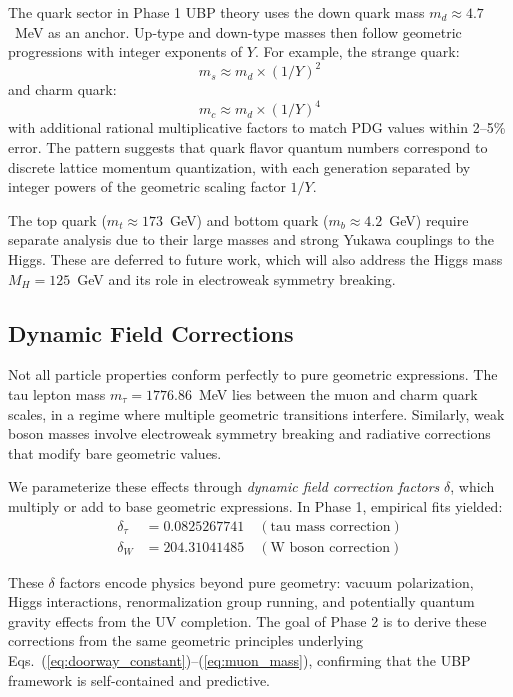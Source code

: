 \documentclass[11pt,a4paper]{article}
\begin{document}
The quark sector in Phase 1 UBP theory uses the down quark mass $m_d \approx 4.7$~MeV as an anchor. Up-type and down-type masses then follow geometric progressions with integer exponents of $Y$. For example, the strange quark:
\begin{equation}
m_s \approx m_d \times (1/Y)^2
\end{equation}
and charm quark:
\begin{equation}
m_c \approx m_d \times (1/Y)^4
\end{equation}
with additional rational multiplicative factors to match PDG values within 2--5\% error. The pattern suggests that quark flavor quantum numbers correspond to discrete lattice momentum quantization, with each generation separated by integer powers of the geometric scaling factor $1/Y$.

The top quark ($m_t \approx 173$~GeV) and bottom quark ($m_b \approx 4.2$~GeV) require separate analysis due to their large masses and strong Yukawa couplings to the Higgs. These are deferred to future work, which will also address the Higgs mass $M_H = 125$~GeV and its role in electroweak symmetry breaking.

\subsection{Dynamic Field Corrections}

Not all particle properties conform perfectly to pure geometric expressions. The tau lepton mass $m_\tau = 1776.86$~MeV lies between the muon and charm quark scales, in a regime where multiple geometric transitions interfere. Similarly, weak boson masses involve electroweak symmetry breaking and radiative corrections that modify bare geometric values.

We parameterize these effects through \emph{dynamic field correction factors} $\delta$, which multiply or add to base geometric expressions. In Phase 1, empirical fits yielded:
\begin{align}
\delta_\tau &= 0.0825267741 \quad (\text{tau mass correction}) \\
\delta_W &= 204.31041485 \quad (\text{W boson correction})
\end{align}

These $\delta$ factors encode physics beyond pure geometry: vacuum polarization, Higgs interactions, renormalization group running, and potentially quantum gravity effects from the UV completion. The goal of Phase 2 is to derive these corrections from the same geometric principles underlying Eqs.~(\ref{eq:doorway_constant})--(\ref{eq:muon_mass}), confirming that the UBP framework is self-contained and predictive.
\end{document}
